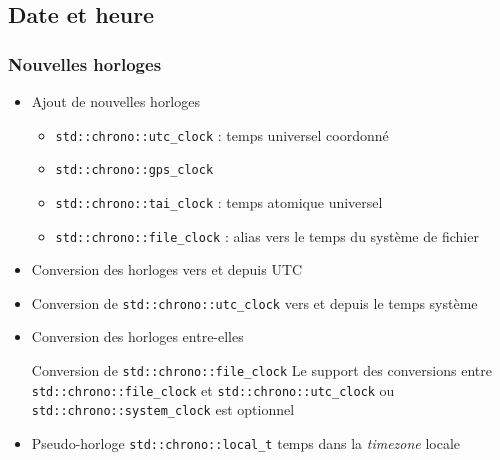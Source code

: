 \documentclass[C++.tex]{subfiles}
\begin{document}
\subsection*{Date et heure}
\begin{frame}[fragile]
	\frametitle{Nouvelles horloges}
	\begin{itemize}
		\item Ajout de nouvelles horloges


		\begin{itemize}
			\item \lstinline|std::chrono::utc_clock| : temps universel coordonné


			\item \lstinline|std::chrono::gps_clock|


			\item \lstinline|std::chrono::tai_clock| : temps atomique universel


			\item \lstinline|std::chrono::file_clock| : alias vers le temps du système de fichier
		\end{itemize}
		\item Conversion des horloges vers et depuis UTC
		\item Conversion de \lstinline|std::chrono::utc_clock| vers et depuis le temps système
		\item Conversion des horloges entre-elles


		\begin{alertblock}{Conversion de \lstinline|std::chrono::file_clock|}
			Le support des conversions entre \lstinline|std::chrono::file_clock| et \lstinline|std::chrono::utc_clock| ou \lstinline|std::chrono::system_clock| est optionnel
		\end{alertblock}

		\item Pseudo-horloge \lstinline|std::chrono::local_t| temps dans la \textit{timezone} locale
	\end{itemize}
\end{frame}
\end{document}
